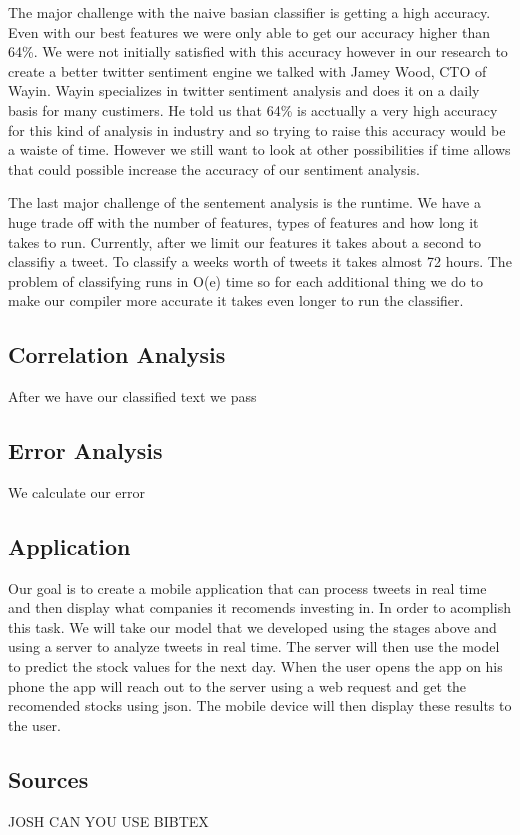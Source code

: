 \documentclass{acm_proc_article-sp}
\begin{document}
The major challenge with the naive basian classifier is getting a high
accuracy. Even with our best features we were only able to get our accuracy
higher than 64\%.  We were not initially satisfied with this accuracy however
in our research to create a better twitter sentiment engine we talked with
Jamey Wood, CTO of Wayin. Wayin specializes in twitter sentiment analysis and
does it on a daily basis for many custimers. He told us that 64\% is acctually
a very high accuracy for this kind of analysis in industry and so trying to
raise this accuracy would be a waiste of time. However we still want to look at
other possibilities if time allows that could possible increase the accuracy of
our sentiment analysis. 

The last major challenge of the sentement analysis is the runtime. We have a
huge trade off with the number of features, types of features and how long it
takes to run. Currently, after we limit our features it takes about a second to
classifiy a tweet. To classify a weeks worth of tweets it takes almost 72
hours. The problem of classifying runs in O(e) time so for each additional
thing we do to make our compiler more accurate it takes even longer to run the
classifier.

\subsection{Correlation Analysis}

After we have our classified text we pass 

\subsection{Error Analysis}

We calculate our error

\subsection{Application}

Our goal is to create a mobile application that can process tweets in real time
and then display what companies it recomends investing in. In order to
acomplish this task. We will take our model that we developed using the stages
above and using a server to analyze tweets in real time. The server will then
use the model to predict the stock values for the next day. When the user opens
the app on his phone the app will reach out to the server using a web request
and get the recomended stocks using json. The mobile device will then display
these results to the user.

\subsection{Sources}

JOSH CAN YOU USE BIBTEX

 
\end{document}
